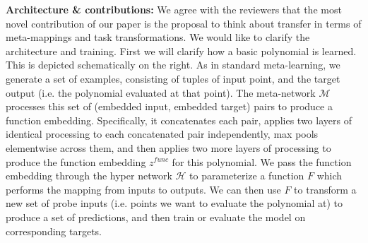 \documentclass{article}
\begin{document}
\textbf{Architecture \& contributions:} We agree with the reviewers that the most novel contribution of our paper is the proposal to think about transfer in terms of meta-mappings and task transformations. We would like to clarify the architecture and training. First we will clarify how a basic polynomial is learned. This is depicted schematically on the right. As in standard meta-learning, we generate a set of examples, consisting of tuples of input point, and the target output (i.e. the polynomial evaluated at that point). The meta-network $\mathcal{M}$ processes this set of (embedded input, embedded target) pairs to produce a function embedding. Specifically, it concatenates each pair, applies two layers of identical processing to each concatenated pair independently, max pools elementwise across them, and then applies two more layers of processing to produce the function embedding $z^{func}$ for this polynomial. We pass the function embedding through the hyper network $\mathcal{H}$ to parameterize a function $F$ which performs the mapping from inputs to outputs. We can then use $F$ to transform a new set of probe inputs (i.e. points we want to evaluate the polynomial at) to produce a set of predictions, and then train or evaluate the model on corresponding targets. \par 
{}
\end{document}
